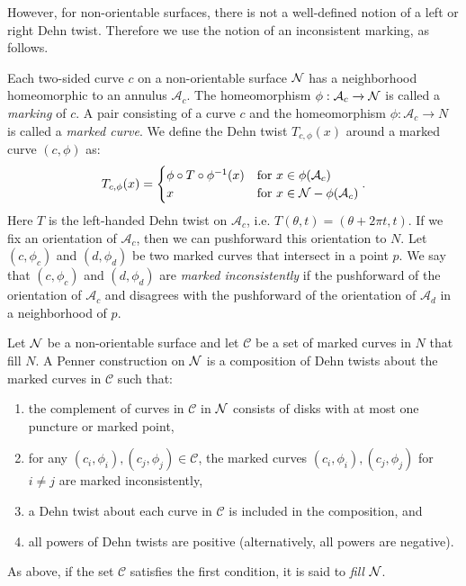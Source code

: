  However, for non-orientable surfaces, there is not a well-defined notion of a left or right Dehn twist. Therefore we use the notion of an inconsistent marking, as follows.

  Each two-sided curve $c$ on a non-orientable surface $\mathcal{N}$ has a neighborhood homeomorphic to an
annulus $\mathcal{A}_c$. The homeomorphism $\phi: \mathcal{A}_c \xrightarrow{} \mathcal{N}$ is called a \textit{marking} of $c$. A pair consisting of a curve $c$ and the homeomorphism $\phi:\mathcal{A}_c\xrightarrow{} N$ is called a {\it marked curve}.  We define the Dehn twist $T_{c,\phi}(x)$ around a marked curve $(c,\phi)$ as:
\begin{align*}
  T_{c,\phi}(x) =
  \begin{cases}
    \phi \circ T \circ \phi^{-1}(x) & \text{for } x \in \phi(\mathcal{A}_c) \\
    x & \text{for } x \in \mathcal{N} - \phi(\mathcal{A}_c)
  \end{cases}.
\end{align*}
Here $T$ is the left-handed Dehn twist on $\mathcal{A}_c$, i.e. $T(\theta,t) = (\theta + 2\pi t,t)$. If we fix an
orientation of $\mathcal{A}_c$, then we can pushforward this orientation to $N$. Let
$(c,\phi_c)$ and $(d,\phi_d)$ be two marked curves that intersect in a point $p$.  We say that $(c,\phi_c)$ and $(d,\phi_d)$ are {\it marked inconsistently} if the
pushforward of the orientation of $\mathcal{A}_c$ and disagrees with the pushforward of the orientation of $\mathcal{A}_d$ in a neighborhood of $p$.

 Let $\mathcal{N}$ be a non-orientable surface and let $\mathcal{C}$ be a set of marked curves in $N$ that fill $N$.  A Penner construction on $\mathcal{N}$ is a composition of Dehn twists about the marked curves in $\mathcal{C}$ such that:
\begin{enumerate}
\item the complement of curves in $\mathcal{C}$ in $\mathcal{N}$ consists of disks with at most one puncture or marked point,
    \item for any $(c_i,\phi_i),(c_j,\phi_j)\in\mathcal{C}$, the marked curves $(c_i,\phi_i),(c_j,\phi_j)$ for $i\neq j$ are marked inconsistently,
    \item a Dehn twist about each curve in $\mathcal{C}$ is included in the composition, and
    \item all powers of Dehn twists are positive (alternatively, all powers are negative).
\end{enumerate}
As above, if the set $\mathcal{C}$ satisfies the first condition, it is said to {\it fill} $\mathcal{N}$.

